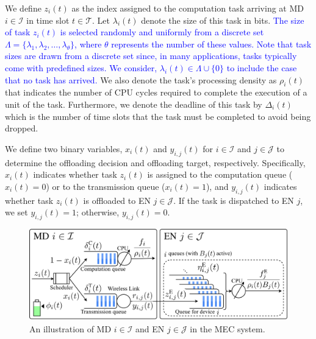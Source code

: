 \documentclass[10pt, journal,letterpaper]{IEEEtran}
\begin{document}
We define $z_i(t)$ as the index assigned to the computation task arriving at MD $i \in \mathcal{I}$ in time slot $t \in \mathcal{T}$. Let $\lambda_i(t)$ denote the size of this task in bits. \textcolor{blue}{The size of task \( z_i(t) \) is selected randomly and uniformly from a discrete set \( \Lambda = \{\lambda_1, \lambda_2, \ldots, \lambda_{\theta}\} \), where \( \theta \) represents the number of these values. Note that task sizes are drawn from a discrete set since, in many applications, tasks typically come with predefined sizes. We consider, $\lambda_i(t) \in \Lambda \cup \{0\}$ to include the case that no task has arrived.} We also denote the task's processing density as $\rho_i(t)$ that indicates the number of CPU cycles required to complete the execution of a unit of the task. Furthermore, we denote the deadline of this task by $\Delta_i(t)$ which is the number of time slots that the task must be completed to avoid being dropped.

We define two binary variables, $x_i(t)$ and $y_{i,j}(t)$ for $i \in \mathcal{I}$ and $j \in \mathcal{J}$ to determine the offloading decision and offloading target, respectively. Specifically, $x_i(t)$ indicates whether task $z_i(t)$ is assigned to the computation queue ($x_i(t) = 0$) or to the transmission queue ($x_i(t) = 1$), and $y_{i,j}(t)$ indicates whether task $z_i(t)$ is offloaded to EN $j \in \mathcal{J}$. If the task is dispatched to EN $j$, we set $y_{i,j}(t) = 1$; otherwise, $y_{i,j}(t) = 0$.


 \begin{figure}
 	\captionsetup{name=Fig.}
 	\centering
 	\includegraphics[width=1\linewidth]{ queue}
 	\vspace*{-5mm}
 	\caption{An illustration of MD $i \in \mathcal{I}$ and EN $j \in \mathcal{J}$ in the MEC system.}
 	\label{fig1}
 \end{figure}
\end{document}
